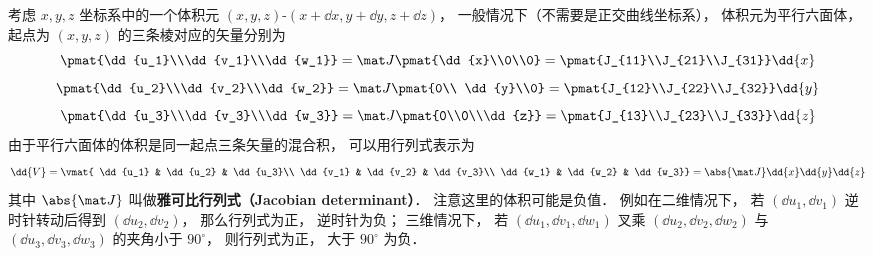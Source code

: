 考虑 $x,y,z$ 坐标系中的一个体积元 $(x,y,z)$-$(x+ \dd{x}, y + \dd{y}, z + \dd{z})$，  一般情况下（不需要是正交曲线坐标系）， 体积元为平行六面体， 起点为 $(x,y,z)$  的三条棱对应的矢量分别为
 \begin{equation}
\pmat{\dd{u_1}\\\dd{v_1}\\\dd{w_1}} = 
\mat J\pmat{\dd{x}\\0\\0} = 
\pmat{J_{11}\\J_{21}\\J_{31}} \dd{x}
\end{equation} 
\begin{equation}
\pmat{\dd{u_2}\\\dd{v_2}\\\dd{w_2}} = 
\mat J \pmat{0\\ \dd{y}\\0} = 
\pmat{J_{12}\\J_{22}\\J_{32}} \dd{y}
\end{equation} 
\begin{equation}
\pmat{\dd{u_3}\\\dd{v_3}\\\dd{w_3}} = 
\mat J \pmat{0\\0\\\dd{z}} = 
\pmat{J_{13}\\J_{23}\\J_{33}} \dd{z}
\end{equation} 
由于平行六面体的体积是同一起点三条矢量的混合积， 可以用行列式表示为
\begin{equation}
\dd{V}
= \vmat{
\dd{u_1} & \dd{u_2} & \dd{u_3}\\
\dd{v_1} & \dd{v_2} & \dd{v_3}\\
\dd{w_1} & \dd{w_2} & \dd{w_3}}
= \abs{\mat J} \dd{x}\dd{y}\dd{z}
\end{equation}
其中 $\abs{\mat J}$  叫做\textbf{雅可比行列式（Jacobian determinant）}． 注意这里的体积可能是负值． 例如在二维情况下， 若 $(\dd{u_1},\dd{v_1})$ 逆时针转动后得到 $(\dd{u_2},\dd{v_2})$， 那么行列式为正， 逆时针为负； 三维情况下， 若 $(\dd{u_1},\dd{v_1},\dd{w_1})$ 叉乘 $(\dd{u_2},\dd{v_2},\dd{w_2})$ 与 $(\dd{u_3},\dd{v_3},\dd{w_3})$ 的夹角小于 $90^\circ$， 则行列式为正， 大于 $90^\circ$ 为负．
